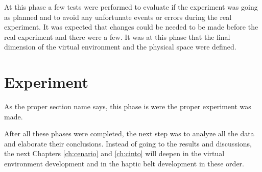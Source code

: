         At this phase a few tests were performed to evaluate if the experiment was going as planned and to avoid any unfortunate events or errors during the real experiment. It was expected that changes could be needed to be made before the real experiment and there were a few. It was at this phase that the final dimension of the virtual environment and the physical space were defined.

\section{Experiment}
\label{sec:experiment}
        
        As the proper section name says, this phase is were the proper experiment was made.

After all these phases were completed, the next step was to analyze all the data and elaborate their conclusions. Instead of going to the results and discussions, the next Chapters \ref{ch:cenario} and \ref{ch:cinto} will deepen in the virtual environment development and in the haptic belt development in these order.

